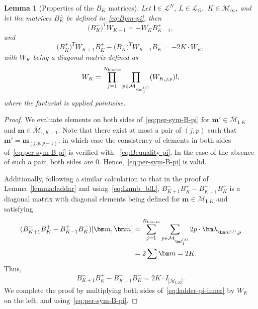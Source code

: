\documentclass{article}
\newcommand{\blamb}[2]{\bm\lambda^{#1}_{#2}}
\newcommand{\card}[1]{|{#1}|}
\newtheorem{lemma}[theorem]{Lemma}
\numberwithin{equation}{section}
\def\Nb{{N_{\rm blocks}}}
\def\bl{{\bm l}}
\def\bbm{{\bm m}}
\def\calM{\mathcal{M}}
\def\calL{\mathcal{L}}
\def\Bp{B^{+}}
\def\Bm{B^{-}}
\begin{document}
\begin{lemma}[Properties of the $B_K$ matrices]\label{lem:laddar-pi}
    Let $\bl\in\calL^N$, $L\in\calL_G,$ $K\in\calM_\infty$, 
    and let the matrices $B_K^\pm$ be defined in~\eqref{eq:Bpm-pi}, then
    \begin{equation}\label{eq:per-sym-B-pi}
        \big(\Bm_{K}\big)^TW_{K-1} = - W_{K}\Bp_{K-1}, 
    \end{equation}
    and 
    \begin{equation}\label{eq:ladder-pi}
        \big(\Bp_{K}\big)^TW_{K+1}\Bp_{K} - \big(\Bm_{K}\big)^TW_{K-1}\Bm_{K} = -2K\cdot W_K,
    \end{equation}
    with $W_K$ being a diagonal matrix defined as
    \begin{equation}
    \label{eq:WK}
                W_K = \prod_{j=1}^\Nb\prod_{p\in\calM_{\bl^{(j)}_1}}
        (W_{K,j,p}) !,
    \end{equation}
    where the factorial is applied pointwise.
\end{lemma}
\begin{proof}
    We evaluate elements on both sides of~\eqref{eq:per-sym-B-pi} for $\bbm'\in\overline{\calM}_{\bl,K}$ and $\bbm\in\overline{\calM}_{\bl,K-1}$. Note that there exist at most a pair of $(j,p)$ such that $\bbm'=\bbm_{(j,p,p-1)}$, in which case 
    the consistency of elements in both sides of~\eqref{eq:per-sym-B-pi} is verified with
    ~\eqref{eq:Bequality-pi}. 
    In the case of the absence of such a pair, both sides are $0$. Hence,~\eqref{eq:per-sym-B-pi} is valid. 

    Additionally, following a similar calculation to that in the proof of Lemma~\ref{lemma:laddar} and using~\eqref{eq:Lamb_blL}, $\Bm_{K+1}\Bp_{K} - \Bp_{K-1}\Bm_{K}$ is a diagonal matrix with diagonal elements being defined for $\bbm\in\overline{\calM}_{\bl,K}$ and satisfying
    \[
    \begin{split}
        (\Bm_{K+1}\Bp_{K} - \Bp_{K-1}\Bm_{K})[\bbm,\bbm] & = \sum_{j=1}^\Nb \sum_{p\in\calM_{\bl^{(j)}_1}} 2p\cdot \blamb{}{\bbm^{(j)},p} \\
        & = 2\sum\bbm = 2K.
    \end{split}
    \]
    Thus, 
    \begin{equation}\label{eq:ladder-pi-inner}  
        \Bm_{K+1}\Bp_{K} - \Bp_{K-1}\Bm_{K} = 2K\cdot I_{\card{\overline{\calM}_{\bl,K}}}.
    \end{equation}
    We complete the proof by multiplying both sides of~\eqref{eq:ladder-pi-inner} by $W_K$ on the left, and using~\eqref{eq:per-sym-B-pi}.
    \end{proof}
\end{document}
